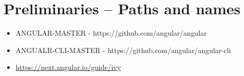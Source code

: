 \section{Preliminaries – Paths and names}


\begin{itemize}
  \item ANGULAR-MASTER - https://github.com/angular/angular
  \item ANGUALR-CLI-MASTER - https://github.com/angular/angular-cli
\end{itemize}


\begin{itemize}
  \item \url{https://next.angular.io/guide/ivy}
\end{itemize}
